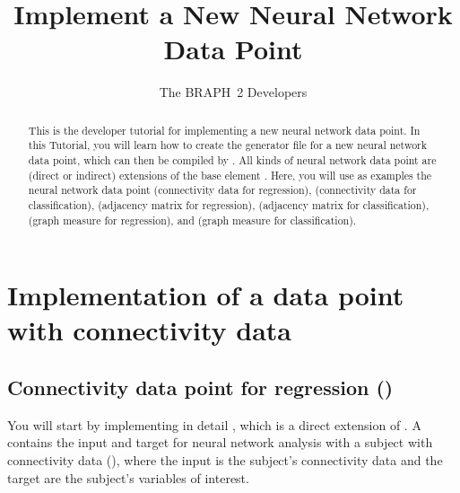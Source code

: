 \documentclass{tufte-handout}
\title{Implement a New Neural Network Data Point}
\author[The BRAPH~2 Developers]{The BRAPH~2 Developers}
\begin{document}
\maketitle

\begin{abstract}
\noindent
This is the developer tutorial for implementing a new neural network data point. 
In this Tutorial, you will learn how to create the generator file  for a new neural network data point, which can then be compiled by . All kinds of neural network data point are (direct or indirect) extensions of the base element . Here, you will use as examples the neural network data point  (connectivity data for regression),  (connectivity data for classification),  (adjacency matrix for regression),  (adjacency matrix for classification),  (graph measure for regression), and  (graph measure for classification).
\end{abstract}

\tableofcontents

\clearpage

\section{Implementation of a data point with connectivity data}

\subsection{Connectivity data point for regression ()}

You will start by implementing in detail , which is a direct extension of .
A  contains the input and target for neural network analysis with a subject with connectivity data (), where the input is the subject's connectivity data and the target are the subject's variables of interest.
\end{document}
